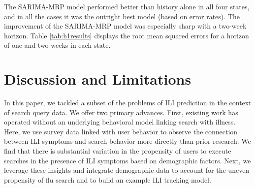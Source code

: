 \documentclass[fleqn,10pt]{wlscirep}
\begin{document}
The SARIMA-MRP model performed better than history alone in all four states, and in all the cases it was the outright best model (based on error rates). The improvement of the SARIMA-MRP model was especially sharp with a two-week horizon. Table \ref{tab:h1results} displays the root mean squared errors for a horizon of one and two weeks in each state. %

\begin{table}[tbp]
\centering
\caption{(h = 1 week/h = 2 weeks) RMSE}
\label{tab:h1results}
\end{table}


\section*{Discussion and Limitations}

In this paper, we tackled a subset of the problems of ILI prediction in the context of search query data. We offer two primary advances. First, existing work has operated without an underlying behavioral model linking search with illness. Here, we use survey data linked with user behavior to observe the connection between ILI symptoms and search behavior more directly than prior research. We find that there is substantial variation in the propensity of users to execute searches in the presence of ILI symptoms based on demographic factors. Next, we leverage these insights and integrate demographic data to account for the uneven propensity of flu search and to build an example ILI tracking model.
\end{document}
